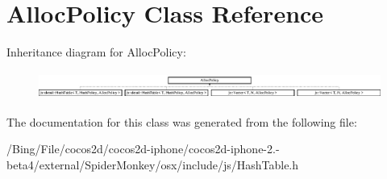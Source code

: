 \hypertarget{class_alloc_policy}{\section{Alloc\-Policy Class Reference}
\label{class_alloc_policy}
}
Inheritance diagram for Alloc\-Policy\-:\begin{figure}[H]
\begin{center}
\leavevmode
\includegraphics[height=0.909091cm]{class_alloc_policy}
\end{center}
\end{figure}


The documentation for this class was generated from the following file\-:\begin{DoxyCompactItemize}
\item 
/\-Bing/\-File/cocos2d/cocos2d-\/iphone/cocos2d-\/iphone-\/2.-\/beta4/external/\-Spider\-Monkey/osx/include/js/Hash\-Table.\-h\end{DoxyCompactItemize}
